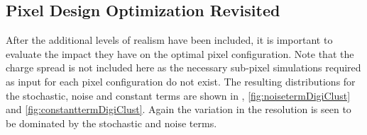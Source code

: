 \subsection{Pixel Design Optimization Revisited}

After the additional levels of realism have been included, it is important to evaluate the impact they have on the optimal pixel configuration. Note that the charge spread is not included here as the necessary sub-pixel simulations required as input for each pixel configuration do not exist. The resulting distributions for the stochastic, noise and constant terms are shown in  , \ref{fig:noisetermDigiClust} and \ref{fig:constanttermDigiClust}. Again the variation in the resolution is seen to be dominated by the stochastic and noise terms.

